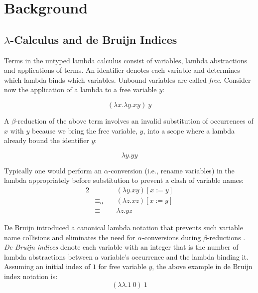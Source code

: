 \documentclass[a4paper,12pt,twoside,openright]{report}
\theoremstyle{definition}
\begin{document}
\section{Background}\label{sec:background}
\subsection{\texorpdfstring{$\lambda$}{Lg}-Calculus and de Bruijn Indices}\label{subsec:lambda}
Terms in the untyped lambda calculus consist of variables, lambda abstractions and applications of terms. An identifier denotes each variable and determines which lambda binds which variables. Unbound variables are called \textit{free}. Consider now the application of a lambda to a free variable $y$:

\begin{equation*}
    (\lambda x.\lambda y.xy)\:y
\end{equation*}

A $\beta$-reduction of the above term involves an invalid substitution of occurrences of $x$ with $y$ because we bring the free variable, $y$, into a scope where a lambda already bound the identifier $y$:

\begin{equation*}
    \lambda y.yy
\end{equation*}

Typically one would perform an $\alpha$-conversion (i.e., rename variables) in the lambda appropriately before substitution to prevent a clash of variable names:
\begin{alignat*}{2}
                  & && \: (\lambda y.xy)[x:=y]    \\
    & \equiv_\alpha && \: (\lambda z.xz)[x:=y]    \\
    & \equiv        && \: \lambda z.yz
\end{alignat*}

De Bruijn introduced a canonical lambda notation that prevents such variable name collisions and eliminates the need for $\alpha$-conversions during $\beta$-reductions \cite{de1972lambda}. \textit{De Bruijn indices} denote each variable with an integer that is the number of lambda abstractions between a variable's occurrence and the lambda binding it. Assuming an initial index of $1$ for free variable $y$, the above example in de Bruijn index notation is:
\begin{equation*}
    (\lambda \lambda. 1 \: 0) \: 1
\end{equation*}
\end{document}
